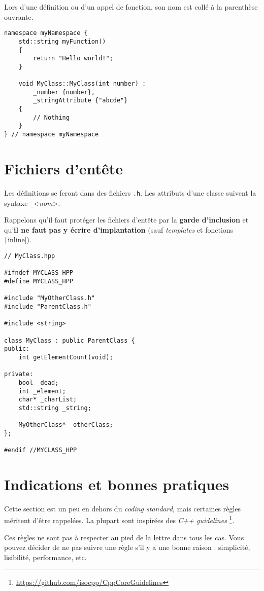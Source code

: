 \documentclass[12pt,a4paper]{article}
\newcommand{\flenglish}[1]{\emph{\foreignlanguage{english}{#1}}}
\begin{document}
Lors d'une définition ou d'un appel de fonction, son nom est collé à la parenthèse ouvrante.

\begin{verbatim}
namespace myNamespace {
	std::string myFunction()
	{
		return "Hello world!";
	}
	
	void MyClass::MyClass(int number) :
		_number {number},
		_stringAttribute {"abcde"}
	{
		// Nothing
	}
} // namespace myNamespace
\end{verbatim}

\section{Fichiers d'entête}
Les définitions se feront dans des fichiers \texttt{.h}. Les attributs d'une classe suivent la syntaxe \texttt{\_}<\emph{nom}>.

\medskip
Rappelons qu'il faut protéger les fichiers d'entête par la \textbf{garde d'inclusion} et qu'\textbf{il ne faut pas y écrire d'implantation} (sauf \flenglish{templates} et fonctions \texttt|inline|).
\begin{verbatim}
// MyClass.hpp

#ifndef MYCLASS_HPP
#define MYCLASS_HPP

#include "MyOtherClass.h"
#include "ParentClass.h"

#include <string>

class MyClass : public ParentClass {
public:
	int getElementCount(void);

private:
	bool _dead;
	int _element;
	char* _charList;
	std::string _string;
	
	MyOtherClass* _otherClass;
};

#endif //MYCLASS_HPP
\end{verbatim}

\section{Indications et bonnes pratiques}
Cette section est un peu en dehors du \flenglish{coding standard}, mais certaines règles méritent d'être rappelées. La plupart sont inspirées des \flenglish{C++ guidelines} \footnote{\url{https://github.com/isocpp/CppCoreGuidelines}}.

Ces règles ne sont pas à respecter au pied de la lettre dans tous les cas. Vous pouvez décider de ne pas suivre une règle s'il y a une bonne raison : simplicité, lisibilité, performance, etc.
\end{document}
